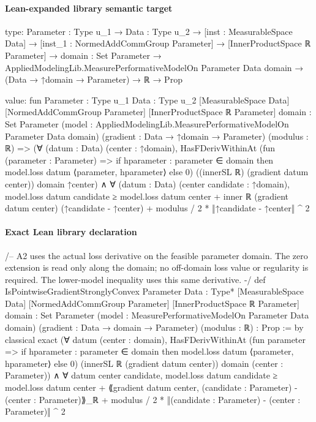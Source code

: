 \documentclass[10pt]{article}
\begin{document}
\paragraph{Lean-expanded library semantic target}
\begin{ReviewVerbatim}
type:
{Parameter : Type u_1} →
  {Data : Type u_2} →
    [inst : MeasurableSpace Data] →
      [inst_1 : NormedAddCommGroup Parameter] →
        [InnerProductSpace ℝ Parameter] →
          {domain : Set Parameter} →
            AppliedModelingLib.MeasurePerformativeModelOn Parameter Data domain →
              (Data → ↑domain → Parameter) → ℝ → Prop

value:
fun {Parameter : Type u_1} {Data : Type u_2} [MeasurableSpace Data] [NormedAddCommGroup Parameter]
    [InnerProductSpace ℝ Parameter] {domain : Set Parameter}
    (model : AppliedModelingLib.MeasurePerformativeModelOn Parameter Data domain)
    (gradient : Data → ↑domain → Parameter) (modulus : ℝ) =>
  (∀ (datum : Data) (center : ↑domain),
      HasFDerivWithinAt
        (fun (parameter : Parameter) =>
          if hparameter : parameter ∈ domain then model.loss datum ⟨parameter, hparameter⟩ else 0)
        ((innerSL ℝ) (gradient datum center)) domain ↑center) ∧
    ∀ (datum : Data) (center candidate : ↑domain),
      model.loss datum candidate ≥
        model.loss datum center + inner ℝ (gradient datum center) (↑candidate - ↑center) +
          modulus / 2 * ‖↑candidate - ↑center‖ ^ 2
\end{ReviewVerbatim}

\paragraph{Exact Lean library declaration}
\begin{ReviewVerbatim}
/-- A2 uses the actual loss derivative on the feasible parameter domain.
The zero extension is read only along the domain; no off-domain loss value or
regularity is required. The lower-model inequality uses this same derivative. -/
def IsPointwiseGradientStronglyConvex
    {Parameter Data : Type*} [MeasurableSpace Data]
    [NormedAddCommGroup Parameter] [InnerProductSpace ℝ Parameter]
    {domain : Set Parameter} (model : MeasurePerformativeModelOn Parameter Data domain)
    (gradient : Data → domain → Parameter) (modulus : ℝ) : Prop := by
  classical
  exact
    (∀ datum (center : domain),
      HasFDerivWithinAt
        (fun parameter => if hparameter : parameter ∈ domain then
          model.loss datum ⟨parameter, hparameter⟩ else 0)
        (innerSL ℝ (gradient datum center)) domain (center : Parameter)) ∧
    ∀ datum center candidate,
      model.loss datum candidate ≥
        model.loss datum center +
          ⟪gradient datum center, (candidate : Parameter) - (center : Parameter)⟫_ℝ +
            modulus / 2 * ‖(candidate : Parameter) - (center : Parameter)‖ ^ 2
\end{ReviewVerbatim}
\end{document}
